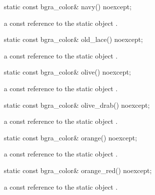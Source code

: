 \begin{itemdecl}
static const bgra_color& navy() noexcept;
\end{itemdecl}
\begin{itemdescr}
\pnum
\returns
a const reference to the static  object .
\end{itemdescr}

\begin{itemdecl}
static const bgra_color& old_lace() noexcept;
\end{itemdecl}
\begin{itemdescr}
\pnum
\returns
a const reference to the static  object .
\end{itemdescr}

\begin{itemdecl}
static const bgra_color& olive() noexcept;
\end{itemdecl}
\begin{itemdescr}
\pnum
\returns
a const reference to the static  object .
\end{itemdescr}

\begin{itemdecl}
static const bgra_color& olive_drab() noexcept;
\end{itemdecl}
\begin{itemdescr}
\pnum
\returns
a const reference to the static  object .
\end{itemdescr}

\begin{itemdecl}
static const bgra_color& orange() noexcept;
\end{itemdecl}
\begin{itemdescr}
\pnum
\returns
a const reference to the static  object .
\end{itemdescr}

\begin{itemdecl}
static const bgra_color& orange_red() noexcept;
\end{itemdecl}
\begin{itemdescr}
\pnum
\returns
a const reference to the static  object .
\end{itemdescr}

